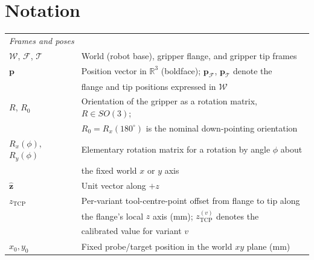 \chapter*{\rm\bfseries Notation}
\label{ch:notation}

\noindent
\begin{tabular}{l l}
\multicolumn{2}{l}{\textit{Frames and poses}} \\ [0.5ex]
$\mathcal{W}$, $\mathcal{F}$, $\mathcal{T}$ & World (robot base), gripper flange, and gripper tip frames \\ [1ex]
$\mathbf{p}$ & Position vector in $\mathbb{R}^3$ (boldface); $\mathbf{p}_\mathcal{F}$, $\mathbf{p}_\mathcal{T}$ denote the \\
             & flange and tip positions expressed in $\mathcal{W}$ \\ [1ex]
$R$, $R_0$ & Orientation of the gripper as a rotation matrix, $R \in SO(3)$; \\
           & $R_0 = R_x(180^{\circ})$ is the nominal down-pointing orientation \\ [1ex]
$R_x(\phi)$, $R_y(\phi)$ & Elementary rotation matrix for a rotation by angle $\phi$ about \\
                          & the fixed world $x$ or $y$ axis \\ [1ex]
$\hat{\mathbf{z}}$ & Unit vector along $+z$ \\ [1ex]
$z_{\text{TCP}}$ & Per-variant tool-centre-point offset from flange to tip along \\
                  & the flange's local $z$ axis (mm); $z_{\text{TCP}}^{(v)}$ denotes the \\
                  & calibrated value for variant $v$ \\ [1ex]
$x_0, y_0$ & Fixed probe/target position in the world $xy$ plane (mm) \\ [1ex]
\end{tabular}

